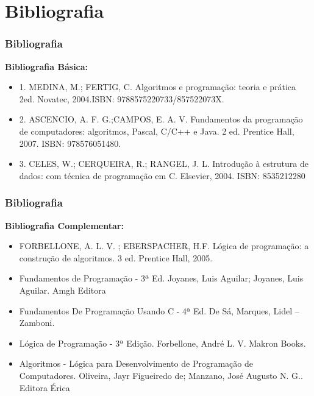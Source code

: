 \section{Bibliografia}
\begin{frame}
	\frametitle{Bibliografia}

	\textbf{Bibliografia Básica:}
	\begin{itemize}
		\item 1. MEDINA, M.; FERTIG, C. Algoritmos e programação: teoria e prática 2ed. Novatec, 2004.ISBN:
		9788575220733/857522073X.
		\item 2. ASCENCIO, A. F. G.;CAMPOS, E. A. V. Fundamentos da programação de computadores: algoritmos,
		Pascal, C/C++ e Java. 2 ed. Prentice Hall, 2007. ISBN: 978576051480.
		\item 3. CELES, W.; CERQUEIRA, R.; RANGEL, J. L. Introdução à estrutura de dados: com técnica de
		programação em C. Elsevier, 2004. ISBN: 8535212280
	\end{itemize}
\end{frame}


\begin{frame}
	\frametitle{Bibliografia}
	
	\textbf{Bibliografia Complementar:}
	\begin{itemize}
		\item FORBELLONE, A. L. V. ; EBERSPACHER, H.F. Lógica de programação: a construção de algoritmos. 3
		ed. Prentice Hall, 2005.
		\item Fundamentos de Programação - 3ª Ed. Joyanes, Luis Aguilar; Joyanes, Luis Aguilar. Amgh Editora
		\item Fundamentos De Programação Usando C - 4ª Ed. De Sá, Marques, Lidel – Zamboni.
		\item Lógica de Programação - 3ª Edição. Forbellone, André L. V. Makron Books.
		\item Algoritmos - Lógica para Desenvolvimento de Programação de Computadores. Oliveira, Jayr Figueiredo de; Manzano, José Augusto N. G.. Editora Érica
	\end{itemize}
\end{frame}




